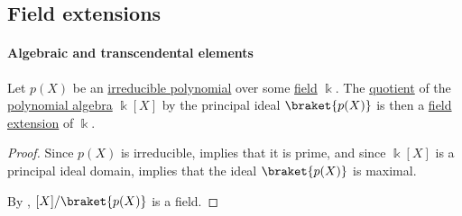 \subsection{Field extensions}\label{subsec:field_extensions}

\paragraph{Algebraic and transcendental elements}

\begin{lemma}\label{thm:quotient_by_irreducible_polynomial}
  Let \( p(X) \) be an \hyperref[def:domain_divisibility/irreducible]{irreducible polynomial} over some \hyperref[def:field]{field} \( \Bbbk \). The \hyperref[def:algebra_over_ring/quotient]{quotient} of the \hyperref[def:polynomial_algebra]{polynomial algebra} \( \Bbbk[X] \) by the principal ideal \( \braket{ p(X) } \) is then a \hyperref[def:field/submodel]{field extension} of \( \Bbbk \).
\end{lemma}
\begin{proof}
  Since \( p(X) \) is irreducible,  implies that it is prime, and since \( \Bbbk[X] \) is a principal ideal domain,  implies that the ideal \( \braket{ p(X) } \) is maximal.

  By , \( \Bbbk[X] / \braket{ p(X) } \) is a field.
\end{proof}

